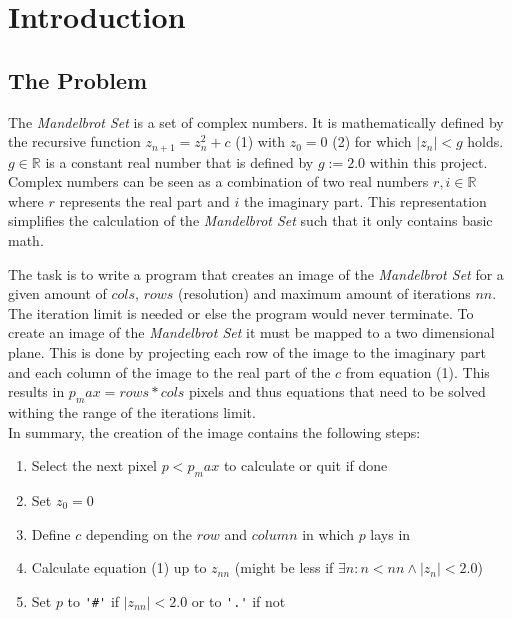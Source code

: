\newcommand{\reporttitle}{CDS Lab Report - Mandelbrot Set}
\newcommand{\ms}{\textit{Mandelbrot Set}}



\baselineskip18pt
\maketitle
\thispagestyle{empty}


\clearpage
\setcounter{page}{1}

\section{Introduction}
\label{sec:introduction}

\subsection{The Problem}
\label{ssec:problem}

The \ms{} is a set of complex numbers. It is mathematically defined by the recursive function $z_{n+1} = z_n^2 + c$ (1) with $z_0 = 0$ (2) for which $|z_n| < g$ holds. $g \in \mathbb{R}$ is a constant real number that is defined by $ g:= 2.0$ within this project. Complex numbers can be seen as a combination of two real numbers $r, i \in \mathbb{R}$ where $r$ represents the real part and $i$ the imaginary part. This representation simplifies the calculation of the \ms{} such that it only contains basic math.

The task is to write a program that creates an image of the \ms{} for a given amount of $cols$, $rows$ (resolution) and maximum amount of iterations $nn$. The iteration limit is needed or else the program would never terminate. To create an image of the \ms{} it must be mapped to a two dimensional plane. This is done by projecting each row of the image to the imaginary part and each column of the image to the real part of the $c$ from equation (1). This results in $p_max = rows*cols$ pixels and thus equations that need to be solved withing the range of the iterations limit.\\

\noindent In summary, the creation of the image contains the following steps:
\begin{enumerate}
  \item Select the next pixel $p < p_max$ to calculate or quit if done
  \item Set $z_0 = 0$
  \item Define $c$ depending on the $row$ and $column$ in which $p$ lays in
  \item Calculate equation (1) up to $z_{nn}$ (might be less if $\exists n: n<nn \land |z_n| < 2.0$)
  \item Set $p$ to \verb|'#'| if $|z_{nn}| < 2.0$ or to \verb|'.'| if not
\end{enumerate}



